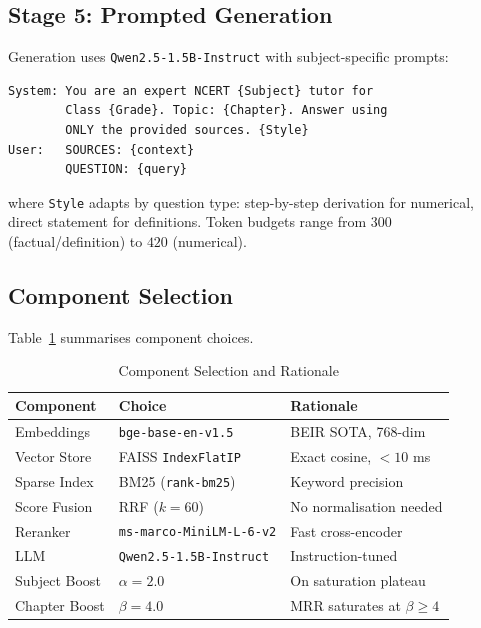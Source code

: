 \documentclass[conference]{IEEEtran}
\begin{document}
\subsection{Stage 5: Prompted Generation}
Generation uses \texttt{Qwen2.5-1.5B-Instruct} with subject-specific prompts:
\begin{lstlisting}
System: You are an expert NCERT {Subject} tutor for
        Class {Grade}. Topic: {Chapter}. Answer using
        ONLY the provided sources. {Style}
User:   SOURCES: {context}
        QUESTION: {query}
\end{lstlisting}
where \texttt{Style} adapts by question type: step-by-step derivation for numerical, direct statement for definitions. Token budgets range from $300$ (factual/definition) to $420$ (numerical).

\subsection{Component Selection}
Table~\ref{tab:components} summarises component choices.

\begin{table}[!t]
\caption{Component Selection and Rationale}
\label{tab:components}
\centering\scriptsize
\setlength{\tabcolsep}{3pt}
\begin{tabular}{@{}p{} p{} p{}@{}}
\toprule
\textbf{Component} & \textbf{Choice} & \textbf{Rationale} \\
\midrule
Embeddings    & \texttt{bge-base-en-v1.5}       & BEIR SOTA, 768-dim \\
Vector Store  & FAISS \texttt{IndexFlatIP}      & Exact cosine, $<\!10$ ms \\
Sparse Index  & BM25 (\texttt{rank-bm25})       & Keyword precision \\
Score Fusion  & RRF ($k{=}60$)                  & No normalisation needed \\
Reranker      & \texttt{ms-marco-MiniLM-L-6-v2} & Fast cross-encoder \\
LLM           & \texttt{Qwen2.5-1.5B-Instruct}  & Instruction-tuned \\
Subject Boost & $\alpha{=}2.0$                  & On saturation plateau \\
Chapter Boost & $\beta{=}4.0$                   & MRR saturates at $\beta{\geq}4$ \\
\bottomrule
\end{tabular}
\end{table}
\end{document}
